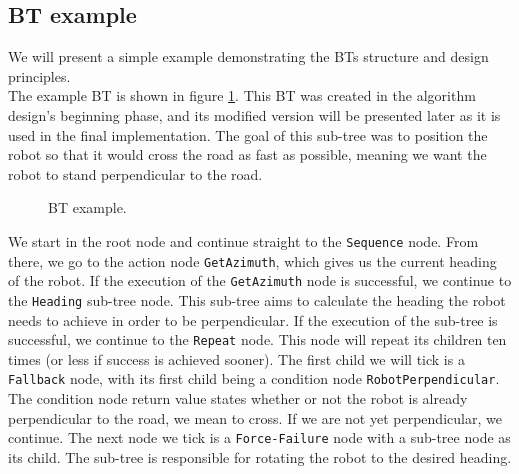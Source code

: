     \subsection{BT example}
        We will present a simple example demonstrating the BTs structure and design principles.\\
        The example BT is shown in figure \ref{fig:example_tree}. This BT was created in the algorithm design's beginning phase, and its modified version will be presented later as it is used in the final implementation. The goal of this sub-tree was to position the robot so that it would cross the road as fast as possible, meaning we want the robot to stand perpendicular to the road.
        \begin{figure}[H]
            \caption{BT example.}
            \label{fig:example_tree}
        \end{figure}
        We start in the root node and continue straight to the \texttt{Sequence} node. From there, we go to the action node \texttt{GetAzimuth}, which gives us the current heading of the robot. If the execution of the \texttt{GetAzimuth} node is successful, we continue to the \texttt{Heading} sub-tree node. This sub-tree aims to calculate the heading the robot needs to achieve in order to be perpendicular. If the execution of the sub-tree is successful, we continue to the \texttt{Repeat} node. This node will repeat its children ten times (or less if success is achieved sooner). The first child we will tick is a \texttt{Fallback} node, with its first child being a condition node \texttt{RobotPerpendicular}. The condition node return value states whether or not the robot is already perpendicular to the road, we mean to cross. If we are not yet perpendicular, we continue. The next node we tick is a \texttt{Force-Failure} node with a sub-tree node as its child. The sub-tree is responsible for rotating the robot to the desired heading.

